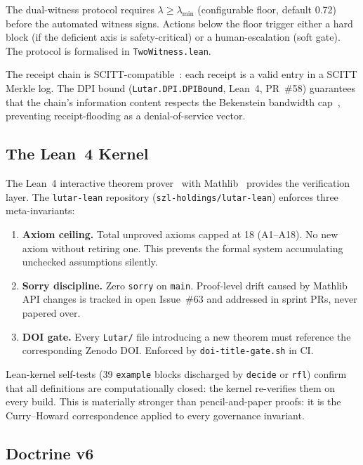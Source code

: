 \noindent
The dual-witness protocol requires \(\lambda \geq \lambda_{\min}\)
(configurable floor, default 0.72) before the automated witness signs.
Actions below the floor trigger either a hard block (if the deficient
axis is safety-critical) or a human-escalation (soft gate).
The protocol is formalised in \texttt{TwoWitness.lean}.

\medskip

The receipt chain is SCITT-compatible~\cite{ietf2024scitt}: each receipt
is a valid entry in a SCITT Merkle log.
The DPI bound (\texttt{Lutar.DPI.DPIBound}, Lean~4, PR~\#58) guarantees
that the chain's information content respects the Bekenstein
bandwidth cap~\cite{bekenstein1981universal}, preventing receipt-flooding
as a denial-of-service vector.

\subsection{The Lean~4 Kernel}
\label{ssec:lean}

The Lean~4 interactive theorem prover~\cite{moura2021lean4} with
Mathlib~\cite{mathlib2020} provides the verification layer.
The \texttt{lutar-lean} repository (\texttt{szl-holdings/lutar-lean})
enforces three meta-invariants:

\begin{enumerate}
  \item \textbf{Axiom ceiling.}  Total unproved axioms capped at 18
    (A1--A18).  No new axiom without retiring one.  This prevents
    the formal system accumulating unchecked assumptions silently.
  \item \textbf{Sorry discipline.}  Zero \texttt{sorry} on \texttt{main}.
    Proof-level drift caused by Mathlib API changes is tracked in
    open Issue~\#63 and addressed in sprint PRs, never papered over.
  \item \textbf{DOI gate.}  Every \texttt{Lutar/} file introducing a
    new theorem must reference the corresponding Zenodo DOI.
    Enforced by \texttt{doi-title-gate.sh} in CI.
\end{enumerate}

Lean-kernel self-tests (39 \texttt{example} blocks discharged by
\texttt{decide} or \texttt{rfl}) confirm that all definitions are
computationally closed: the kernel re-verifies them on every build.
This is materially stronger than pencil-and-paper proofs: it is the
Curry--Howard correspondence applied to every governance invariant.

\subsection{Doctrine v6}
\label{ssec:docv6}

